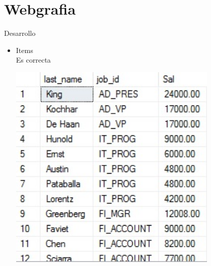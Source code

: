 \section{Webgrafia} 
Desarrollo

\begin{itemize}
	\item Items
	\\Es correcta
	\begin{center}
	\includegraphics[width=10cm]{./Imagenes/actividad0101} 
	\end{center}



\end{itemize} 